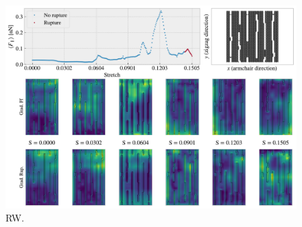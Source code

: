\begin{figure}[H]
  \centering
  \includegraphics[width=0.8\linewidth]{figures/search/grad_cam_RW_search_max_drop0.pdf}
  \caption{RW.}
  \label{fig:GC_RW_search}
\end{figure}  







